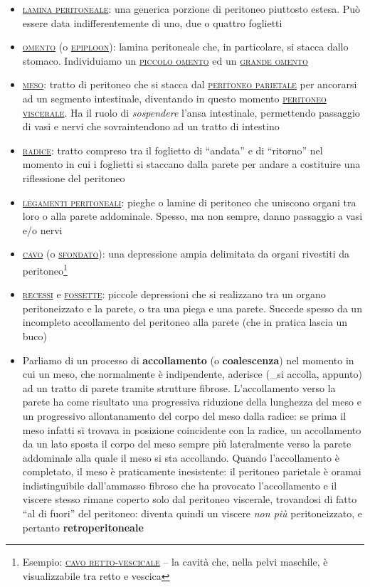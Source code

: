 \documentclass[italian,]{article}
\providecommand{\tightlist}{%
  \setlength{\itemsep}{0pt}\setlength{\parskip}{0pt}}
\renewcommand{\a}[1]{\underline{\textsc{#1}}}
\begin{document}
\begin{itemize}
\tightlist
\item
  \a{lamina peritoneale}: una generica porzione di peritoneo piuttosto
  estesa. Può essere data indifferentemente di uno, due o quattro
  foglietti
\item
  \a{omento} (o \a{epiploon}): lamina peritoneale che, in particolare,
  si stacca dallo stomaco. Individuiamo un \a{piccolo omento} ed un
  \a{grande omento}
\item
  \a{meso}: tratto di peritoneo che si stacca dal
  \a{peritoneo parietale} per ancorarsi ad un segmento intestinale,
  diventando in questo momento \a{peritoneo viscerale}. Ha il ruolo di
  \emph{sospendere} l'ansa intestinale, permettendo passaggio di vasi e
  nervi che sovraintendono ad un tratto di intestino
\item
  \a{radice}: tratto compreso tra il foglietto di ``andata'' e di
  ``ritorno'' nel momento in cui i foglietti si staccano dalla parete
  per andare a costituire una riflessione del peritoneo
\item
  \a{legamenti peritoneali}: pieghe o lamine di peritoneo che uniscono
  organi tra loro o alla parete addominale. Spesso, ma non sempre, danno
  passaggio a vasi e/o nervi
\item
  \a{cavo} (o \a{sfondato}): una depressione ampia delimitata da organi
  rivestiti da peritoneo\footnote{Esempio: \a{cavo retto-vescicale} --
    la cavità che, nella pelvi maschile, è visualizzabile tra retto e
    vescica}
\item
  \a{recessi} e \a{fossette}: piccole depressioni che si realizzano tra
  un organo peritoneizzato e la parete, o tra una piega e una parete.
  Succede spesso da un incompleto accollamento del peritoneo alla parete
  (che in pratica lascia un buco)
\item
  Parliamo di un processo di \textbf{accollamento} (o
  \textbf{coalescenza}) nel momento in cui un meso, che normalmente è
  indipendente, aderisce (\_si accolla, appunto) ad un tratto di parete
  tramite strutture fibrose. L'accollamento verso la parete ha come
  risultato una progressiva riduzione della lunghezza del meso e un
  progressivo allontanamento del corpo del meso dalla radice: se prima
  il meso infatti si trovava in posizione coincidente con la radice, un
  accollamento da un lato sposta il corpo del meso sempre più
  lateralmente verso la parete addominale alla quale il meso si sta
  accollando. Quando l'accollamento è completato, il meso è praticamente
  inesistente: il peritoneo parietale è oramai indistinguibile
  dall'ammasso fibroso che ha provocato l'accollamento e il viscere
  stesso rimane coperto solo dal peritoneo viscerale, trovandosi di
  fatto ``al di fuori'' del peritoneo: diventa quindi un viscere
  \emph{non più} peritoneizzato, e pertanto \textbf{retroperitoneale}
\end{itemize}
\end{document}
